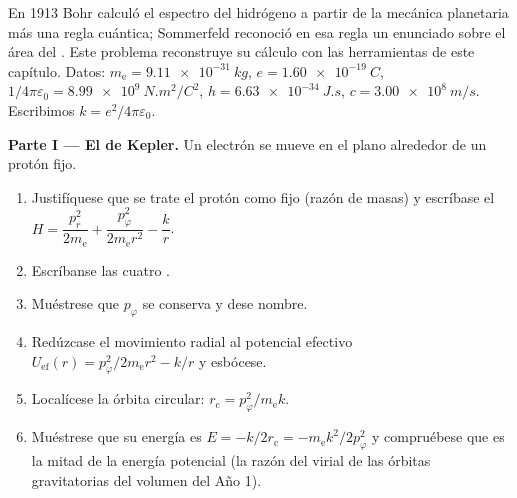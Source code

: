 \begin{problem}\label{pb:b3:hamiltonian-mechanics:1}
En 1913 Bohr calculó el espectro del hidrógeno a partir de la mecánica
planetaria más una regla cuántica; Sommerfeld reconoció en esa regla un
enunciado sobre el área del . Este problema reconstruye su
cálculo con las herramientas de este capítulo. Datos: $m_{\text{e}} =
\qty{9.11e-31}{kg}$, $e = \qty{1.60e-19}{C}$, $1/4\pi\varepsilon_0 =
\qty{8.99e9}{N.m^2/C^2}$, $h = \qty{6.63e-34}{J.s}$, $c =
\qty{3.00e8}{m/s}$. Escribimos $k = e^2/4\pi\varepsilon_0$.

\medskip\noindent\textbf{Parte I --- El  de Kepler.}
Un electrón se mueve en el plano alrededor de un protón fijo.
\begin{enumerate}
  \item Justifíquese que se trate el protón como fijo (razón de masas) y
        escríbase el  $H = \dfrac{p_r^2}{2m_{\text{e}}} +
        \dfrac{p_\varphi^2}{2m_{\text{e}}r^2} - \dfrac{k}{r}$.
  \item Escríbanse las cuatro .
  \item Muéstrese que $p_\varphi$ se conserva y dese nombre.
  \item Redúzcase el movimiento radial al potencial efectivo
        $U_{\text{ef}}(r) = p_\varphi^2/2m_{\text{e}}r^2 - k/r$ y
        esbócese.
  \item Localícese la órbita circular: $r_{\text{c}} =
        p_\varphi^2/m_{\text{e}}k$.
  \item Muéstrese que su energía es $E = -k/2r_{\text{c}} =
        -m_{\text{e}}k^2/2p_\varphi^2$ y compruébese que es la mitad de la
        energía potencial (la razón del virial de las órbitas
        gravitatorias del volumen del Año 1).
\end{enumerate}


\end{problem}
